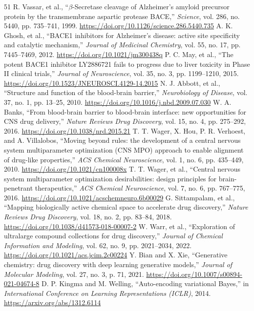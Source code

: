 \documentclass[10pt,a4paper]{article}
\begin{document}
\begin{thebibliography}{51}
 R. Vassar, et al., ``$\beta$-Secretase cleavage of Alzheimer's amyloid precursor protein by the transmembrane aspartic protease BACE,'' \textit{Science}, vol. 286, no. 5440, pp. 735--741, 1999. \url{https://doi.org/10.1126/science.286.5440.735}
 A. K. Ghosh, et al., ``BACE1 inhibitors for Alzheimer's disease: active site specificity and catalytic mechanism,'' \textit{Journal of Medicinal Chemistry}, vol. 55, no. 17, pp. 7445--7469, 2012. \url{https://doi.org/10.1021/jm300438q}
 P. C. May, et al., ``The potent BACE1 inhibitor LY2886721 fails to progress due to liver toxicity in Phase II clinical trials,'' \textit{Journal of Neuroscience}, vol. 35, no. 3, pp. 1199--1210, 2015. \url{https://doi.org/10.1523/JNEUROSCI.4129-14.2015}
 N. J. Abbott, et al., ``Structure and function of the blood-brain barrier,'' \textit{Neurobiology of Disease}, vol. 37, no. 1, pp. 13--25, 2010. \url{https://doi.org/10.1016/j.nbd.2009.07.030}
 W. A. Banks, ``From blood-brain barrier to blood-brain interface: new opportunities for CNS drug delivery,'' \textit{Nature Reviews Drug Discovery}, vol. 15, no. 4, pp. 275--292, 2016. \url{https://doi.org/10.1038/nrd.2015.21}
 T. T. Wager, X. Hou, P. R. Verhoest, and A. Villalobos, ``Moving beyond rules: the development of a central nervous system multiparameter optimization (CNS MPO) approach to enable alignment of drug-like properties,'' \textit{ACS Chemical Neuroscience}, vol. 1, no. 6, pp. 435--449, 2010. \url{https://doi.org/10.1021/cn100008x}
 T. T. Wager, et al., ``Central nervous system multiparameter optimization desirabilities: design principles for brain-penetrant therapeutics,'' \textit{ACS Chemical Neuroscience}, vol. 7, no. 6, pp. 767--775, 2016. \url{https://doi.org/10.1021/acschemneuro.6b00029}
 G. Sittampalam, et al., ``Mapping biologically active chemical space to accelerate drug discovery,'' \textit{Nature Reviews Drug Discovery}, vol. 18, no. 2, pp. 83--84, 2018. \url{https://doi.org/10.1038/d41573-018-00007-2}
 W. Warr, et al., ``Exploration of ultralarge compound collections for drug discovery,'' \textit{Journal of Chemical Information and Modeling}, vol. 62, no. 9, pp. 2021--2034, 2022. \url{https://doi.org/10.1021/acs.jcim.2c00224}
 Y. Bian and X. Xie, ``Generative chemistry: drug discovery with deep learning generative models,'' \textit{Journal of Molecular Modeling}, vol. 27, no. 3, p. 71, 2021. \url{https://doi.org/10.1007/s00894-021-04674-8}
 D. P. Kingma and M. Welling, ``Auto-encoding variational Bayes,'' in \textit{International Conference on Learning Representations (ICLR)}, 2014. \url{https://arxiv.org/abs/1312.6114}

\end{thebibliography}
\end{document}
